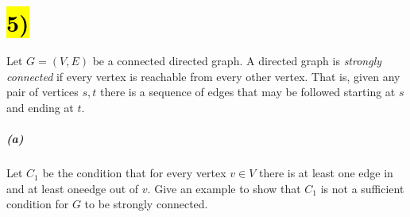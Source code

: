 \documentclass[11pt]{article}
\begin{document}
\section*{\hl{5)}} Let $G = (V, E)$ be a connected directed graph. A directed graph is \textit{strongly connected} if every vertex is reachable from every other vertex. That is, given any pair of vertices $s, t$ there is a sequence of edges that may be followed starting at $s$ and ending at $t$.
\subparagraph*{(a)} {Let $C_1$ be the condition that for every vertex $v \in V$ there is at least one edge in and at least one\hspace{14mm}edge out of $v$. Give an example to show that $C_1$ is not a sufficient condition for $G$ to be strongly\hspace{12mm} connected.}
\end{document}
